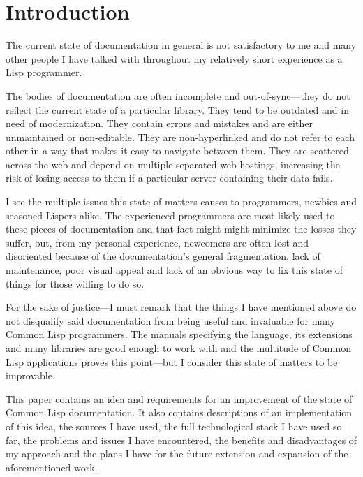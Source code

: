 \section{Introduction}

The current state of \cl{} documentation in general is not satisfactory to me and many other people I have talked with throughout my relatively short experience as a Lisp programmer.

The bodies of documentation are often incomplete and out-of-sync---they do not reflect the current state of a particular library. They tend to be outdated and in need of modernization. They contain errors and mistakes and are either unmaintained or non-editable. They are non-hyperlinked and do not refer to each other in a way that makes it easy to navigate between them. They are scattered across the web and depend on multiple separated web hostings, increasing the risk of losing access to them if a particular server containing their data fails.

I see the multiple issues this state of matters causes to \cl{} programmers, newbies and seasoned Lispers alike. The experienced programmers are most likely used to these pieces of documentation and that fact might might minimize the losses they suffer, but, from my personal experience, newcomers are often lost and disoriented because of the documentation's general fragmentation, lack of maintenance, poor visual appeal and lack of an obvious way to fix this state of things for those willing to do so.

For the sake of justice---I must remark that the things I have mentioned above do not disqualify said documentation from being useful and invaluable for many Common Lisp programmers. The manuals specifying the language, its extensions and many libraries are good enough to work with and the multitude of Common Lisp applications proves this point---but I consider this state of matters to be improvable.

This paper contains an idea and requirements for an improvement of the state of Common Lisp documentation. It also contains descriptions of an implementation of this idea, the sources I have used, the full technological stack I have used so far, the problems and issues I have encountered, the benefits and disadvantages of my approach and the plans I have for the future extension and expansion of the aforementioned work.
